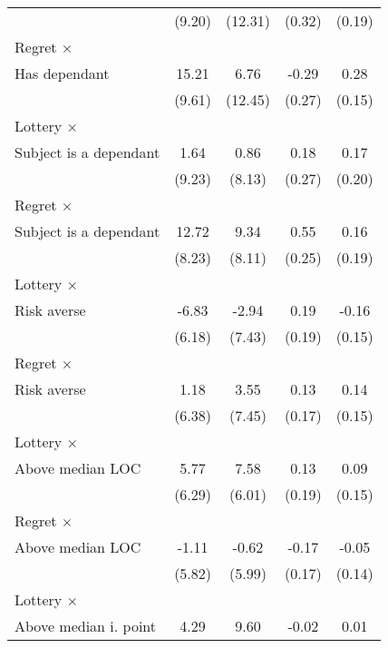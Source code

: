 \begin{table}[htbp]
\begin{tabular}{l*{4}{c}}
                &   (9.20)         &  (12.31)         &   (0.32)         &   (0.19)         \\
\addlinespace
Regret $\times$ \\ Has dependant&    15.21         &     6.76         &    -0.29         &     0.28\sym{*}  \\
                &   (9.61)         &  (12.45)         &   (0.27)         &   (0.15)         \\
\addlinespace
Lottery $\times$ \\ Subject is a dependant&     1.64         &     0.86         &     0.18         &     0.17         \\
                &   (9.23)         &   (8.13)         &   (0.27)         &   (0.20)         \\
\addlinespace
Regret $\times$ \\ Subject is a dependant&    12.72         &     9.34         &     0.55\sym{**} &     0.16         \\
                &   (8.23)         &   (8.11)         &   (0.25)         &   (0.19)         \\
\addlinespace
Lottery $\times$ \\ Risk averse&    -6.83         &    -2.94         &     0.19         &    -0.16         \\
                &   (6.18)         &   (7.43)         &   (0.19)         &   (0.15)         \\
\addlinespace
Regret $\times$ \\ Risk averse&     1.18         &     3.55         &     0.13         &     0.14         \\
                &   (6.38)         &   (7.45)         &   (0.17)         &   (0.15)         \\
\addlinespace
Lottery $\times$ \\ Above median LOC&     5.77         &     7.58         &     0.13         &     0.09         \\
                &   (6.29)         &   (6.01)         &   (0.19)         &   (0.15)         \\
\addlinespace
Regret $\times$ \\ Above median LOC&    -1.11         &    -0.62         &    -0.17         &    -0.05         \\
                &   (5.82)         &   (5.99)         &   (0.17)         &   (0.14)         \\
\addlinespace
Lottery $\times$ \\ Above median i. point&     4.29         &     9.60         &    -0.02         &     0.01         \\

\end{tabular}
\end{table}
